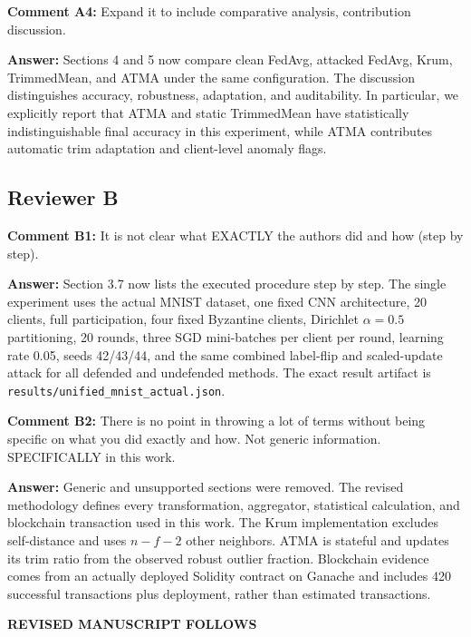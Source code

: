 \documentclass[10pt,letterpaper]{article}
\begin{document}
\textbf{Comment A4:} Expand it to include comparative analysis, contribution
discussion.

\textbf{Answer:} Sections 4 and 5 now compare clean FedAvg, attacked FedAvg,
Krum, TrimmedMean, and ATMA under the same configuration. The discussion
distinguishes accuracy, robustness, adaptation, and auditability. In particular,
we explicitly report that ATMA and static TrimmedMean have statistically
indistinguishable final accuracy in this experiment, while ATMA contributes
automatic trim adaptation and client-level anomaly flags.

\subsection*{Reviewer B}
\textbf{Comment B1:} It is not clear what EXACTLY the authors did and how
(step by step).

\textbf{Answer:} Section 3.7 now lists the executed procedure step by step. The
single experiment uses the actual MNIST dataset, one fixed CNN architecture,
20 clients, full participation, four fixed Byzantine clients, Dirichlet
$\alpha=0.5$ partitioning, 20 rounds, three SGD mini-batches per client per
round, learning rate 0.05, seeds 42/43/44, and the same combined label-flip and
scaled-update attack for all defended and undefended methods. The exact result
artifact is \texttt{results/unified\_mnist\_actual.json}.

\textbf{Comment B2:} There is no point in throwing a lot of terms without being
specific on what you did exactly and how. Not generic information. SPECIFICALLY
in this work.

\textbf{Answer:} Generic and unsupported sections were removed. The revised
methodology defines every transformation, aggregator, statistical calculation,
and blockchain transaction used in this work. The Krum implementation excludes
self-distance and uses $n-f-2$ other neighbors. ATMA is stateful and updates its
trim ratio from the observed robust outlier fraction. Blockchain evidence comes
from an actually deployed Solidity contract on Ganache and includes 420
successful transactions plus deployment, rather than estimated transactions.

\begin{center}
\textbf{REVISED MANUSCRIPT FOLLOWS}
\end{center}
\end{document}

